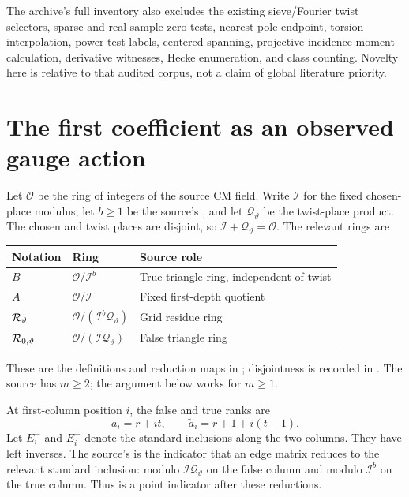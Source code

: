 The archive's full inventory also excludes the existing sieve/Fourier twist selectors, sparse and real-sample zero tests, nearest-pole endpoint, torsion interpolation, power-test labels, centered spanning, projective-incidence moment calculation, derivative witnesses, Hecke enumeration, and class counting. Novelty here is relative to that audited corpus, not a claim of global literature priority.

\section{The first coefficient as an observed gauge action}
\label{sec:setup}

Let $\mathcal O$ be the ring of integers of the source CM field. Write $\mathcal I$ for the fixed chosen-place modulus, let $b\geq1$ be the source's , and let $\mathcal Q_\vartheta$ be the twist-place product. The chosen and twist places are disjoint, so $\mathcal I+\mathcal Q_\vartheta=\mathcal O$. The relevant rings are
\begin{center}
\begin{tabular}{@{}lll@{}}
\toprule
Notation & Ring & Source role\\
\midrule
$B$ & $\mathcal O/\mathcal I^b$ & True triangle ring, independent of twist\\
$A$ & $\mathcal O/\mathcal I$ & Fixed first-depth quotient\\
$\mathcal R_\vartheta$ & $\mathcal O/(\mathcal I^b\mathcal Q_\vartheta)$ & Grid residue ring\\
$\mathcal R_{0,\vartheta}$ & $\mathcal O/(\mathcal I\mathcal Q_\vartheta)$ & False triangle ring\\
\bottomrule
\end{tabular}
\end{center}
These are the definitions and reduction maps in ; disjointness is recorded in . The source has $m\geq2$; the argument below works for $m\geq1$.

At first-column position $i$, the false and true ranks are
\[
 a_i=r+it,\qquad \widetilde a_i=r+1+i(t-1).
\]
Let $E_i^-$ and $E_i^+$ denote the standard inclusions along the two columns. They have left inverses. The source's  is the indicator that an edge matrix reduces to the relevant standard inclusion: modulo $\mathcal I\mathcal Q_\vartheta$ on the false column and modulo $\mathcal I^b$ on the true column. Thus  is a point indicator after these reductions.

